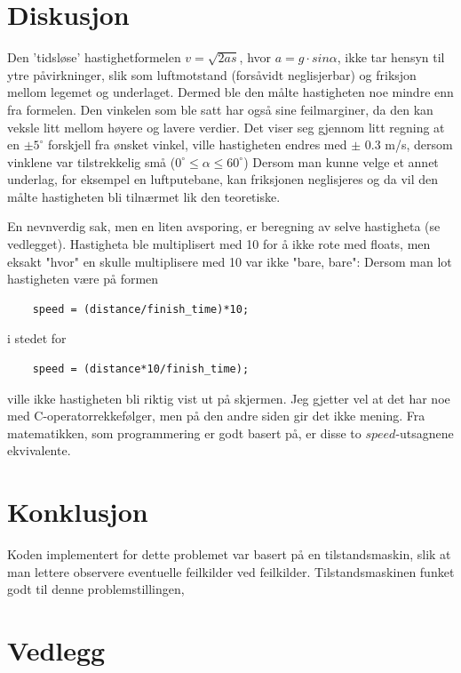 \documentclass[11pt, a4paper]{article}
\begin{document}
\section{Diskusjon}

Den 'tidsløse' hastighetformelen $v = \sqrt{2as}$, hvor $a = g\cdot sin\alpha$, ikke tar hensyn til ytre påvirkninger, slik som luftmotstand (forsåvidt neglisjerbar) og friksjon mellom legemet og underlaget. Dermed ble den målte hastigheten noe mindre enn fra formelen. Den vinkelen som ble satt har også sine feilmarginer, da den kan veksle litt mellom høyere og lavere verdier. Det viser seg gjennom litt regning at en $\pm 5^{\circ}$ forskjell fra ønsket vinkel, ville hastigheten endres med $\pm$ 0.3 m/s, dersom vinklene var tilstrekkelig små ($0^\circ \leq\alpha\leq 60^\circ$)
\newline
Dersom man kunne velge et annet underlag, for eksempel en luftputebane, kan friksjonen neglisjeres og da vil den målte hastigheten bli tilnærmet lik den teoretiske.

En nevnverdig sak, men en liten avsporing, er beregning av selve hastigheta (se vedlegget). Hastigheta ble multiplisert med 10 for å ikke rote med floats, men eksakt "hvor" en skulle multiplisere med 10 var ikke "bare, bare": Dersom man lot hastigheten være på formen
\begin{lstlisting}
	speed = (distance/finish_time)*10;
\end{lstlisting}
i stedet for
\begin{lstlisting}
	speed = (distance*10/finish_time);
\end{lstlisting}
ville ikke hastigheten bli riktig vist ut på skjermen. Jeg gjetter vel at det har noe med C-operatorrekkefølger, men på den andre siden gir det ikke mening. Fra matematikken, som programmering er godt basert på, er disse to $speed$-utsagnene ekvivalente. 


% 
\section{Konklusjon}
Koden implementert for dette problemet var basert på en tilstandsmaskin, slik at man lettere observere eventuelle feilkilder ved feilkilder. Tilstandsmaskinen funket godt til denne problemstillingen, 

\section{Vedlegg}
\newpage


\end{document}
